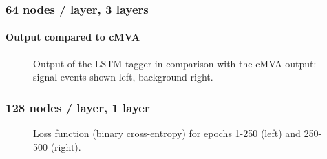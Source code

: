 \documentclass{beamer}
\begin{document}
\begin{frame}
  \frametitle{64 nodes / layer, 3 layers}
  \framesubtitle{Output compared to cMVA}
  \begin{figure}[htb]
    \centering

    \caption{Output of the LSTM tagger in comparison with the cMVA output: signal events shown left, background right.}
  \end{figure}
\end{frame}


\begin{frame}
  \frametitle{128 nodes / layer, 1 layer}

  \begin{figure}[htb]
    \centering

    \caption{Loss function (binary cross-entropy) for epochs 1-250 (left) and 250-500 (right).}
  \end{figure}

\end{frame}
\end{document}
